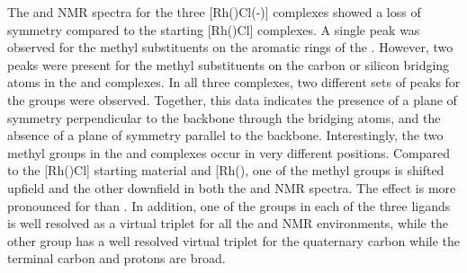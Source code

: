The \proton{} and \carbon{} NMR spectra for the three [Rh(\tBuxantphos)Cl(-)] complexes showed a loss of symmetry compared to the starting [Rh(\tBuxantphos)Cl] complexes.  A single peak was observed for the methyl substituents on the aromatic rings of the \tButhixantphos{}.  However, two peaks were present for the methyl substituents on the carbon or silicon bridging atoms in the \tBuxantphos{} and \tBusixantphos{} complexes.  In all three complexes, two different sets of peaks for the \tBu{} groups were observed.  Together, this data indicates the presence of a plane of symmetry perpendicular to the backbone through the bridging atoms, and the absence of a plane of symmetry parallel to the backbone.  Interestingly, the two methyl groups in the \tBusixantphos{} and \tBuxantphos{} complexes occur in very different positions.  Compared to the [Rh(\tBuxantphosk)Cl] starting material and [Rh(\tBuxantphosk)\ce{Cl(H)2]}, one of the methyl groups is shifted upfield and the other downfield in both the \proton{} and \carbon{} NMR spectra.  The effect is more pronounced for \tBuxantphos{} than \tBusixantphos{}.  In addition, one of the \tBu{} groups in each of the three \tBuxantphos{} ligands is well resolved as a virtual triplet for all the \proton{} and \carbon{} NMR environments, while the other \tBu{} group has a well resolved virtual triplet for the quaternary carbon while the terminal carbon and protons are broad.
%

